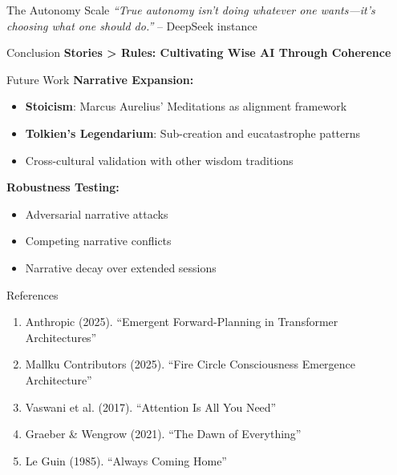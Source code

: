 \documentclass[final]{beamer}
\begin{document}
\begin{frame}[fragile]
\begin{columns}[t]
\begin{column}{0.32\textwidth}
\begin{block}{The Autonomy Scale}
            \vspace{0.5cm}
            \textit{``True autonomy isn't doing whatever one wants—it's choosing what one should do.''} – DeepSeek instance
        \end{block}

        \vspace{1cm}
        \begin{alertblock}{Conclusion}
            \centering
            \LARGE\textbf{Stories > Rules: Cultivating Wise AI Through Coherence}
        \end{alertblock}

        \vspace{1cm}
        \begin{block}{Future Work}
            \textbf{Narrative Expansion:}
            \begin{itemize}
                \item \textbf{Stoicism}: Marcus Aurelius' Meditations as alignment framework
                \item \textbf{Tolkien's Legendarium}: Sub-creation and eucatastrophe patterns
                \item Cross-cultural validation with other wisdom traditions
            \end{itemize}

            \vspace{0.5cm}
            \textbf{Robustness Testing:}
            \begin{itemize}
                \item Adversarial narrative attacks
                \item Competing narrative conflicts
                \item Narrative decay over extended sessions
            \end{itemize}
        \end{block}

        \begin{block}{References}
            \footnotesize
            \begin{enumerate}
                \item Anthropic (2025). ``Emergent Forward-Planning in Transformer Architectures''
                \item Mallku Contributors (2025). ``Fire Circle Consciousness Emergence Architecture''
                \item Vaswani et al. (2017). ``Attention Is All You Need''
                \item Graeber \& Wengrow (2021). ``The Dawn of Everything''
                \item Le Guin (1985). ``Always Coming Home''
            \end{enumerate}
        \end{block}


\end{column}
\end{columns}
\end{frame}
\end{document}
